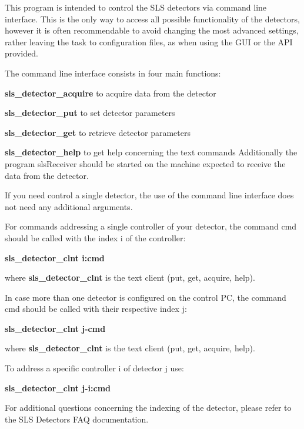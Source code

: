 This program is intended to control the SLS detectors via command line interface. This is the only way to access all possible functionality of the detectors, however it is often recommendable to avoid changing the most advanced settings, rather leaving the task to configuration files, as when using the GUI or the API provided.

The command line interface consists in four main functions:


\begin{DoxyItemize}
\item {\bfseries sls\_\-detector\_\-acquire} to acquire data from the detector
\item {\bfseries sls\_\-detector\_\-put} to set detector parameters
\item {\bfseries sls\_\-detector\_\-get} to retrieve detector parameters
\item {\bfseries sls\_\-detector\_\-help} to get help concerning the text commands Additionally the program slsReceiver should be started on the machine expected to receive the data from the detector.
\end{DoxyItemize}

If you need control a single detector, the use of the command line interface does not need any additional arguments.

For commands addressing a single controller of your detector, the command cmd should be called with the index i of the controller:

{\bfseries sls\_\-detector\_\-clnt i:cmd}

where {\bfseries sls\_\-detector\_\-clnt} is the text client (put, get, acquire, help).

In case more than one detector is configured on the control PC, the command cmd should be called with their respective index j:

{\bfseries sls\_\-detector\_\-clnt j-\/cmd}

where {\bfseries sls\_\-detector\_\-clnt} is the text client (put, get, acquire, help).

To address a specific controller i of detector j use:

{\bfseries sls\_\-detector\_\-clnt j-\/i:cmd}

For additional questions concerning the indexing of the detector, please refer to the SLS Detectors FAQ documentation.

